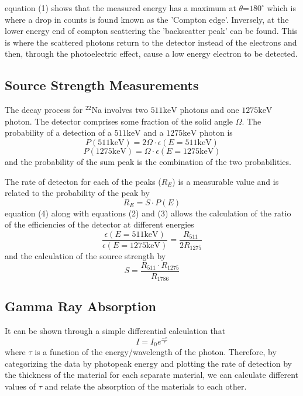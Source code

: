 \documentclass[11pt]{article} %
\begin{document}
        equation (1) shows that the measured energy has a maximum at $\theta$=$180^{\circ}$ which is where a drop in counts is found known as the 'Compton edge'. Inversely, at the lower energy end of compton scattering the 'backscatter peak' can be found. This is where the scattered photons return to the detector instead of the electrons and then, through the photoelectric effect, cause a low energy electron to be detected.

    \subsection{Source Strength Measurements}
        The decay process for $^{22}$Na involves two $511\unit{\keV}$ photons and one $1275\unit{\keV}$ photon. The detector comprises some fraction of the solid angle $\Omega$. The probability of a detection of a $511\unit{\keV}$ and a $1275\unit{\keV}$ photon is
        \begin{equation}
            P(511\unit{\keV}) = 2\Omega\cdot\epsilon(E=511\unit{\keV})
        \end{equation}
        \begin{equation}
            P(1275\unit{\keV}) = \Omega\cdot\epsilon(E=1275\unit{\keV})
        \end{equation}
        and the probability of the sum peak is the combination of the two probabilities.
        
        The rate of detecton for each of the peaks ($R_E$) is a measurable value and is related to the probability of the peak by
        \begin{equation}
            R_E = S\cdot P(E)
        \end{equation}
        equation (4) along with equations (2) and (3) allows the calculation of the ratio of the efficiencies of the detector at different energies
        \begin{equation}
            \frac{\epsilon(E=511\unit{\keV})}{\epsilon(E=1275\unit{\keV})} = \frac{R_{511}}{2R_{1275}}
        \end{equation}
        and the calculation of the source strength by
        \begin{equation}
            S = \frac{R_{511}\cdot R_{1275}}{R_{1786}}
        \end{equation}
    \subsection{Gamma Ray Absorption}
        It can be shown through a simple differential calculation that
        \begin{equation}
            I = I_0 e^{\frac{-x}{\tau}}
        \end{equation}
        where $\tau$ is a function of the energy/wavelength of the photon. Therefore, by categorizing the data by photopeak energy and plotting the rate of detection by the thickness of the material for each separate material, we can calculate different values of $\tau$ and relate the absorption of the materials to each other.
\end{document}
